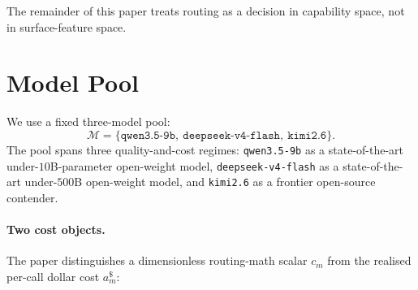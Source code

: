 \documentclass[twocolumn,10pt,a4paper]{article}
\begin{document}
The remainder of this paper treats routing as a decision in capability space, not in surface-feature space.

\section{Model Pool}\label{sec:pool}
We use a fixed three-model pool:
\[
  \mathcal{M} =
  \{\texttt{qwen3.5-9b},\ \texttt{deepseek-v4-flash},\ \texttt{kimi2.6}\}.
\]
The pool spans three quality-and-cost regimes: \texttt{qwen3.5-9b} as a state-of-the-art under-$10$B-parameter open-weight model, \texttt{deepseek-v4-flash} as a state-of-the-art under-$500$B open-weight model, and \texttt{kimi2.6} as a frontier open-source contender.

\paragraph{Two cost objects.} The paper distinguishes a dimensionless routing-math scalar $c_m$ from the realised per-call dollar cost $a_m^{\$}$:
\end{document}
